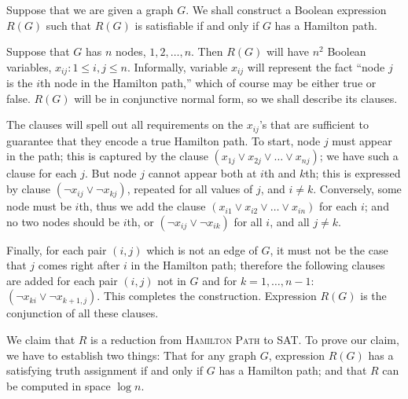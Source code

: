 \documentclass[12pt]{article}
\begin{document}
\begin{defbox}
  Suppose that we are given a graph $G$. We shall construct a Boolean expression $R(G)$ such that $R(G)$ is satisfiable if and only if $G$ has a Hamilton path.
\end{defbox}
  Suppose that $G$ has $n$ nodes, $1,2,\ldots,n$. Then $R(G)$ will have $n^2$ Boolean variables, $x_{ij} : 1 \leq i, j \leq n$. Informally, variable $x_{ij}$ will represent the fact ``node $j$ is the $i$th node in the Hamilton path,'' which of course may be either true or false. $R(G)$ will be in conjunctive normal form, so we shall describe its clauses.

The clauses will spell out all requirements on the $x_{ij}$'s that are sufficient to guarantee that they encode a true Hamilton path. To start, node $j$ must appear in the path; this is captured by the clause $(x_{1j} \vee x_{2j} \vee \ldots \vee x_{nj})$; we have such a clause for each $j$. But node $j$ cannot appear both at $i$th and $k$th; this is expressed by clause $(\neg x_{ij} \vee \neg x_{kj})$, repeated for all values of $j$, and $i \neq k$. Conversely, some node must be $i$th, thus we add the clause $(x_{i1} \vee x_{i2} \vee \ldots \vee x_{in})$ for each $i$; and no two nodes should be $i$th, or $(\neg x_{ij} \vee \neg x_{ik})$ for all $i$, and all $j \neq k$. 

Finally, for each pair $(i,j)$ which is not an edge of $G$, it must not be the case that $j$ comes right after $i$ in the Hamilton path; therefore the following clauses are added for each pair $(i,j)$ not in $G$ and for $k = 1, \ldots, n-1$: $(\neg x_{ki} \vee \neg x_{k+1,j})$. This completes the construction. Expression $R(G)$ is the conjunction of all these clauses.

We claim that $R$ is a reduction from \textsc{Hamilton Path} to \textsc{SAT}. To prove our claim, we have to establish two things: That for any graph $G$, expression $R(G)$ has a satisfying truth assignment if and only if $G$ has a Hamilton path; and that $R$ can be computed in space $\log n$.
\end{document}
